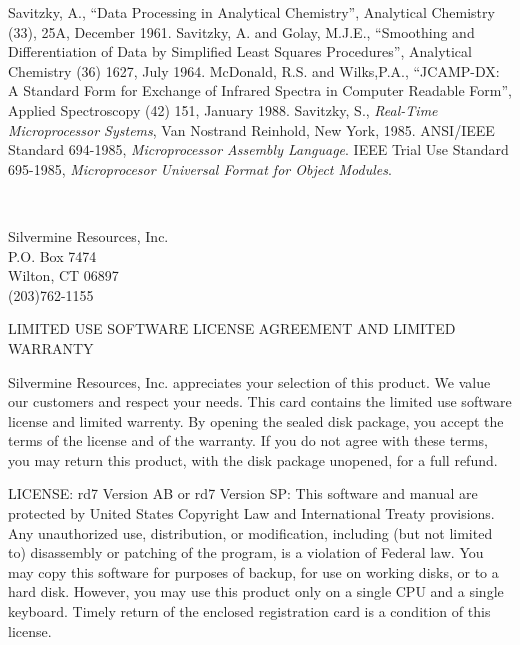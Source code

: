 {\small
\begin{thebibliography}{9}
	Savitzky, A., ``Data Processing in Analytical Chemistry'',
	Analytical Chemistry (33), 25A, December 1961.
	Savitzky, A. and Golay, M.J.E., ``Smoothing and Differentiation
	of Data by Simplified Least Squares Procedures'', Analytical
	Chemistry (36) 1627, July 1964.
	McDonald, R.S. and Wilks,P.A., ``JCAMP-DX: A Standard Form for
	Exchange of Infrared Spectra in Computer Readable Form'', 
	Applied Spectroscopy (42) 151, January 1988.
	Savitzky, S., {\em Real-Time Microprocessor Systems},
	Van Nostrand Reinhold, New York, 1985.
	ANSI/IEEE Standard 694-1985, {\em Microprocessor
	Assembly Language}.
	IEEE Trial Use Standard 695-1985, {\em Microprocesor Universal
	Format for Object Modules}.
\end{thebibliography}
}
\medskip
\noindent\ \hrulefill\ 
\begin{center}
	Silvermine Resources, Inc.	\\
	P.O. Box 7474			\\
	Wilton, CT 06897		\\
	(203)762-1155			\\
\end{center}

 
\newpage
\begin{center}
     LIMITED USE SOFTWARE LICENSE AGREEMENT AND LIMITED WARRANTY
\end{center}

Silvermine Resources, Inc. appreciates your selection of this product.
We value our customers and respect your needs.  This card contains
the limited use software license and limited warrenty.  By opening
the sealed disk package, you accept the terms of the license and of
the warranty.  If you do not agree with these terms, you may return
this product, with the disk package unopened, for a full refund.

LICENSE:  rd7 Version AB or rd7 Version SP:  This software and manual
are protected by United States Copyright Law and International Treaty
provisions.  Any unauthorized use, distribution, or modification,
including (but not limited to) disassembly or patching of the
program, is a violation of Federal law.  You may copy this software for
purposes of backup, for use on working disks, or to a hard disk.
However, you may use this product only on a single CPU and a single
keyboard.  Timely return of the enclosed registration card is a 
condition of this license.  

